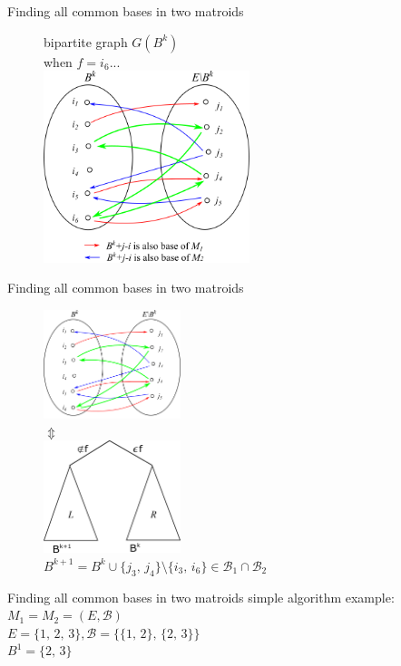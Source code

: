\documentclass[11pt,xcolor=dvipsnames,table,dvipdfmx]{beamer}
\begin{document}
\begin{frame}{Finding all common bases in two matroids}
 \begin{figure}
  bipartite graph $G(B^k)$\\
  when $f = i_6$...\vspace{0.52cm}\\
  \centering
  \includegraphics[width=6cm]{text8631-16-2-8.png}\\
 \end{figure}
\end{frame}

\begin{frame}{Finding all common bases in two matroids}
 \begin{figure}
  \centering
  \includegraphics[width=4cm]{text8631-16-2-11.png}\\
  $\Updownarrow$ \\
  \includegraphics[width=4cm]{text8631-16-2-9.png}\\
  $B^{k+1} = B^k \cup \{j_3,\,j_4\}\setminus \{i_3,\,i_6\} \in \mathcal{B}_1 \cap \mathcal{B}_2$
 \end{figure}
\end{frame}

\begin{frame}{Finding all common bases in two matroids}
 simple algorithm example:\\
 $M_1 = M_2 = (E, \mathcal{B})$\\
 $E = \{1,\,2,\,3\}, \mathcal{B} = \{\{1,\,2\},\,\{2,\,3\}\}$\\
 $B^1 = \{2,\,3\}$
\end{frame}
\end{document}
